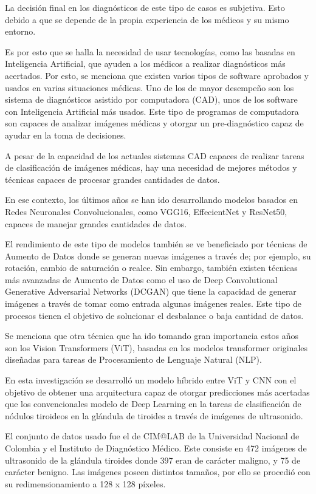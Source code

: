 La decisión final en los diagnósticos de este tipo de casos es subjetiva. Esto debido a que se depende de la propia experiencia de los médicos y su mismo entorno.

Es por esto que se halla la necesidad de usar tecnologías, como las basadas en Inteligencia Artificial, que ayuden a los médicos a realizar diagnósticos más acertados. Por esto, se menciona que existen varios tipos de software aprobados y usados en varias situaciones médicas. Uno de los de mayor desempeño son los sistema de diagnósticos asistido por computadora (CAD), unos de los software con Inteligencia Artificial más usados. Este tipo de programas de computadora son capaces de analizar imágenes médicas y otorgar un pre-diagnóstico capaz de ayudar en la toma de decisiones. 

A pesar de la capacidad de los actuales sistemas CAD capaces de realizar tareas de clasificación de imágenes médicas, hay una necesidad de mejores métodos y técnicas capaces de procesar grandes cantidades de datos.

En ese contexto, los últimos años se han ido desarrollando modelos basados en Redes Neuronales Convolucionales, como VGG16, EffecientNet y ResNet50, capaces de manejar grandes cantidades de datos.

El rendimiento de este tipo de modelos también se ve beneficiado por técnicas de Aumento de Datos donde se generan nuevas imágenes a través de; por ejemplo, su rotación, cambio de saturación o realce. Sin embargo, también existen técnicas más avanzadas de Aumento de Datos como el uso de Deep Convolutional Generative Adversarial Networks (DCGAN) que tiene la capacidad de generar imágenes a través de tomar como entrada algunas imágenes reales. Este tipo de procesos tienen el objetivo de solucionar el desbalance o baja cantidad de datos.

Se menciona que otra técnica que ha ido tomando gran importancia estos años son los Vision Transformers (ViT), basadas en los modelos transformer originales diseñadas para tareas de Procesamiento de Lenguaje Natural (NLP).

En esta investigación se desarrolló un modelo híbrido entre ViT y CNN con el objetivo de obtener una arquitectura capaz de otorgar predicciones más acertadas que los convencionales modelo de Deep Learning en la tareas de clasificación de nódulos tiroideos en la glándula de tiroides a través de imágenes de ultrasonido.

El conjunto de datos usado fue el de CIM@LAB de la Universidad Nacional de Colombia y el Instituto de Diagnóstico Médico. Este consiste en 472 imágenes de ultrasonido de la glándula tiroides donde 397 eran de carácter maligno, y 75 de carácter benigno. Las imágenes poseen distintos tamaños, por ello se procedió con su redimensionamiento a 128 x 128 píxeles.

